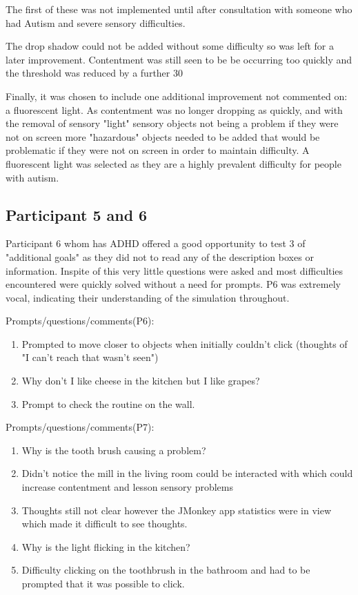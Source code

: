 \documentclass[11pt]{report}
\begin{document}
The first of these was not implemented until after consultation with someone who had Autism and severe sensory difficulties.

The drop shadow could not be added without some difficulty so was left for a later improvement. Contentment was still seen to be be occurring too quickly and the threshold was reduced by a further 30%

Finally, it was chosen to include one additional improvement not commented on: a fluorescent light. As contentment was no longer dropping as quickly, and with the removal of sensory "light" sensory objects not being a problem if they were not on screen more "hazardous" objects needed to be added that would be problematic if they were not on screen in order to maintain difficulty. A fluorescent light was selected as they are a highly prevalent difficulty for people with autism. 

\subsection*{Participant 5 and 6}

Participant 6 whom has ADHD offered a good opportunity to test 3 of "additional goals" as they did not to read any of the description boxes or information. Inspite of this very little questions were asked and most difficulties encountered were quickly solved without a need for prompts. P6 was extremely vocal, indicating their understanding of the simulation throughout.

Prompts/questions/comments(P6):
\begin{enumerate}
\item Prompted to move closer to objects when initially couldn't click (thoughts of "I can't reach that wasn't seen")
\item Why don't I like cheese in the kitchen but I like grapes?
\item Prompt to check the routine on the wall.
\end{enumerate}

Prompts/questions/comments(P7):
\begin{enumerate}
\item Why is the tooth brush causing a problem?
\item Didn't notice the mill in the living room could be interacted with which could increase contentment and lesson sensory problems
\item Thoughts still not clear however the JMonkey app statistics were in view which made it difficult to see thoughts.
\item Why is the light flicking in the kitchen?
\item Difficulty clicking on the toothbrush in the bathroom and had to be prompted that it was possible to click.
\end{enumerate}
\end{document}
